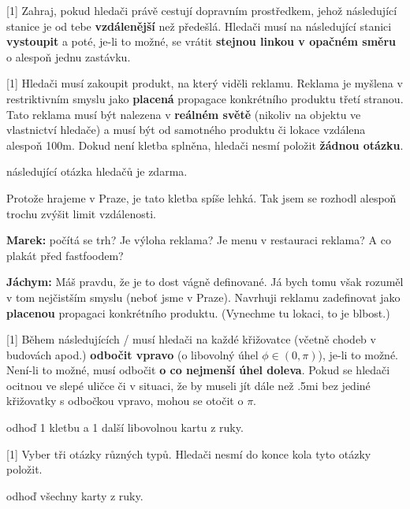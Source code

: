 \begin{cards}
	 Zahraj, pokud hledači právě cestují dopravním prostředkem, jehož následující stanice je od tebe \textbf{vzdálenější} než předešlá. Hledači musí na následující stanici \textbf{vystoupit} a poté, je-li to možné, se vrátit \textbf{stejnou linkou v opačném směru} o alespoň jednu zastávku.

	 Hledači musí zakoupit produkt, na který viděli reklamu. Reklama je myšlena v restriktivním smyslu jako \textbf{placená} propagace konkrétního produktu třetí stranou. Tato reklama musí být nalezena v \textbf{reálném světě} (nikoliv na objektu ve vlastnictví hledače) a musí být od samotného produktu či lokace vzdálena alespoň 100m. Dokud není kletba splněna, hledači nesmí položit \textbf{žádnou otázku}.

	\cost následující otázka hledačů je zdarma.

	\begin{reasoning}
		Protože hrajeme v Praze, je tato kletba spíše lehká. Tak jsem se rozhodl alespoň trochu zvýšit limit vzdálenosti.
	\end{reasoning}

	\begin{reasoning}
		\textbf{Marek:} počítá se trh? Je výloha reklama? Je menu v restauraci reklama? A co plakát před fastfoodem?

		\textbf{Jáchym:} Máš pravdu, že je to dost vágně definované. Já bych tomu však rozuměl v tom nejčistším smyslu (neboť jsme v Praze). Navrhuji reklamu zadefinovat jako \textbf{placenou} propagaci konkrétního produktu. (Vynechme tu lokaci, to je blbost.)
	\end{reasoning}

	 Během následujících \timecurseturnright/ musí hledači na každé křižovatce (včetně chodeb v budovách apod.) \textbf{odbočit vpravo} (o libovolný úhel $\phi \in (0, \pi)$), je-li to možné. Není-li to možné, musí odbočit \textbf{o co nejmenší úhel doleva}. Pokud se hledači ocitnou ve slepé uličce či v situaci, že by museli jít dále než \dist.5mi bez jediné křižovatky s odbočkou vpravo, mohou se otočit o $\pi$.

	\cost odhoď 1 kletbu a 1 další libovolnou kartu z ruky.

	 Vyber tři otázky různých typů. Hledači nesmí do konce kola tyto otázky položit.

	\cost odhoď všechny karty z ruky.


\end{cards}
